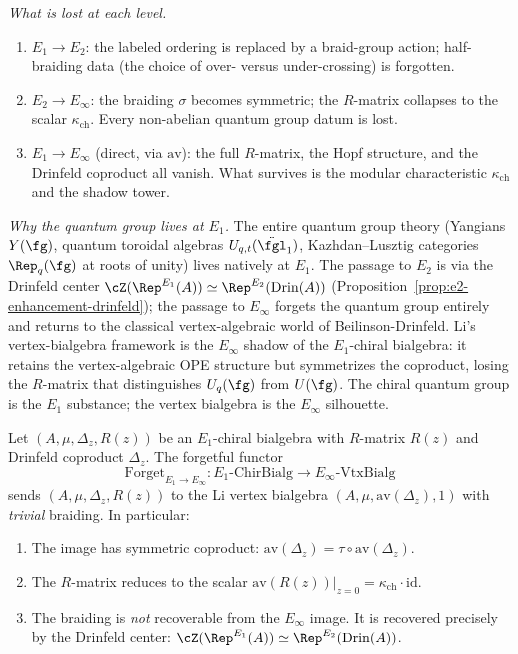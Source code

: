 \begin{remark}
\noindent\emph{What is lost at each level.}
\begin{enumerate}[label=(\roman*)]
 \item $E_1 \to E_2$: the labeled ordering is replaced by a braid-group
 action; half-braiding data (the choice of over- versus
 under-crossing) is forgotten.
 \item $E_2 \to E_\infty$: the braiding $\sigma$ becomes symmetric; the
 $R$-matrix collapses to the scalar $\kappa_{\mathrm{ch}}$.
 Every non-abelian quantum group datum is lost.
 \item $E_1 \to E_\infty$ (direct, via $\mathrm{av}$): the full
 $R$-matrix, the Hopf structure, and the Drinfeld coproduct all
 vanish. What survives is the modular characteristic
 $\kappa_{\mathrm{ch}}$ and the shadow tower.
\end{enumerate}

\noindent\emph{Why the quantum group lives at $E_1$.}
The entire quantum group theory (Yangians $Y(\fg)$, quantum
toroidal algebras $U_{q,t}(\ddot{\fgl}_1)$, Kazhdan--Lusztig
categories $\Rep_q(\fg)$ at roots of unity) lives natively at $E_1$.
The passage to $E_2$ is via the Drinfeld center
$\cZ(\Rep^{E_1}(A)) \simeq \Rep^{E_2}(\mathrm{Drin}(A))$
(Proposition~\ref{prop:e2-enhancement-drinfeld}); the passage to
$E_\infty$ forgets the quantum group entirely and returns to the
classical vertex-algebraic world of Beilinson-Drinfeld.
Li's vertex-bialgebra framework is the $E_\infty$ shadow of the
$E_1$-chiral bialgebra: it retains the vertex-algebraic OPE structure
but symmetrizes the coproduct, losing the $R$-matrix that distinguishes
$U_q(\fg)$ from $U(\fg)$. The chiral quantum group is the $E_1$
substance; the vertex bialgebra is the $E_\infty$ silhouette.
\end{remark}

\begin{proposition}
\label{prop:forgetful-e1-einfty-bialgebra}
Let $(A, \mu, \Delta_z, R(z))$ be an $E_1$-chiral bialgebra with
$R$-matrix $R(z)$ and Drinfeld coproduct $\Delta_z$. The forgetful
functor
\[
 \mathrm{Forget}_{E_1 \to E_\infty} \colon
 E_1\text{-}\mathrm{ChirBialg} \longrightarrow
 E_\infty\text{-}\mathrm{VtxBialg}
\]
sends $(A, \mu, \Delta_z, R(z))$ to the Li vertex bialgebra
$(A, \mu, \mathrm{av}(\Delta_z), 1)$ with \emph{trivial} braiding. In
particular:
\begin{enumerate}[label=\textup{(\alph*)}]
 \item The image has symmetric coproduct:
 $\mathrm{av}(\Delta_z) = \tau \circ \mathrm{av}(\Delta_z)$.
 \item The $R$-matrix reduces to the scalar
 $\mathrm{av}(R(z))|_{z=0} = \kappa_{\mathrm{ch}} \cdot \mathrm{id}$.
 \item The braiding is \emph{not} recoverable from the
 $E_\infty$ image. It is recovered precisely by the Drinfeld center:
 $\cZ(\Rep^{E_1}(A)) \simeq \Rep^{E_2}(\mathrm{Drin}(A))$.
\end{enumerate}
\end{proposition}

